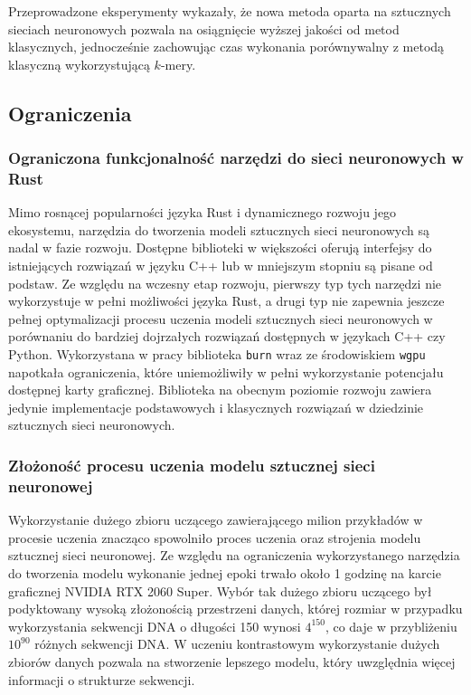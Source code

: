         Przeprowadzone eksperymenty wykazały, że nowa metoda oparta na sztucznych sieciach neuronowych pozwala na osiągnięcie wyższej jakości od metod klasycznych, jednocześnie zachowując czas wykonania porównywalny z metodą klasyczną wykorzystującą $k$-mery.

    \subsection{Ograniczenia}

        \subsubsection{Ograniczona funkcjonalność narzędzi do sieci neuronowych w Rust}

            Mimo rosnącej popularności języka Rust\cite{Rust:popularity} i dynamicznego rozwoju jego ekosystemu, narzędzia do tworzenia modeli sztucznych sieci neuronowych są nadal w fazie rozwoju. Dostępne biblioteki w większości oferują interfejsy do istniejących rozwiązań w języku C++ lub w mniejszym stopniu są pisane od podstaw. Ze względu na wczesny etap rozwoju, pierwszy typ tych narzędzi nie wykorzystuje w pełni możliwości języka Rust, a drugi typ nie zapewnia jeszcze pełnej optymalizacji procesu uczenia modeli sztucznych sieci neuronowych w porównaniu do bardziej dojrzałych rozwiązań dostępnych w językach C++ czy Python. Wykorzystana w pracy biblioteka \texttt{burn} wraz ze środowiskiem \texttt{wgpu} napotkała ograniczenia, które uniemożliwiły w pełni wykorzystanie potencjału dostępnej karty graficznej. Biblioteka na obecnym poziomie rozwoju zawiera jedynie implementacje podstawowych i klasycznych rozwiązań w dziedzinie sztucznych sieci neuronowych.

        \subsubsection{Złożoność procesu uczenia modelu sztucznej sieci neuronowej}

            Wykorzystanie dużego zbioru uczącego zawierającego milion przykładów w procesie uczenia znacząco spowolniło proces uczenia oraz strojenia modelu sztucznej sieci neuronowej. Ze względu na ograniczenia wykorzystanego narzędzia do tworzenia modelu wykonanie jednej epoki trwało około 1 godzinę na karcie graficznej NVIDIA RTX 2060 Super. Wybór tak dużego zbioru uczącego był podyktowany wysoką złożonością przestrzeni danych, której rozmiar w przypadku wykorzystania sekwencji DNA o długości 150 wynosi $4^{150}$, co daje w przybliżeniu $10^{90}$ różnych sekwencji DNA. W uczeniu kontrastowym wykorzystanie dużych zbiorów danych pozwala na stworzenie lepszego modelu, który uwzględnia więcej informacji o strukturze sekwencji.

